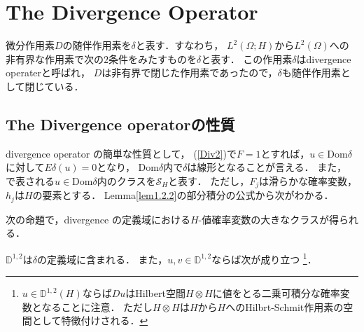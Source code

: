 \section{The Divergence Operator}
\begin{definition}%
微分作用素$D$の随伴作用素を$\delta$と表す．すなわち，
$L^2(\Omega;H)$から$L^2(\Omega)$への非有界な作用素で次の$2$条件をみたすものを$\delta$と表す．
この作用素$\delta$はdivergence operaterと呼ばれ，
$D$は非有界で閉じた作用素であったので，$\delta$も随伴作用素として閉じている．

\subsection{The Divergence operatorの性質}
divergence operator の簡単な性質として，
(\ref{Div2})で$F=1$とすれば，$u\in\text{Dom}\delta$に対して$E\delta(u)=0$となり，
$\text{Dom}\delta$内で$\delta$は線形となることが言える．
また，
で表される$u\in\text{Dom}\delta$内のクラスを$\mathcal{S}_H$と表す．
ただし，$F_j$は滑らかな確率変数，$h_j$は$H$の要素とする．
Lemma\ref{lem1.2.2}の部分積分の公式から次がわかる．

次の命題で，divergence の定義域における$H$-値確率変数の大きなクラスが得られる．
\begin{proposition}\label{prop1.3.1}
$\mathbb{D}^{1,2}$は$\delta$の定義域に含まれる．
また，$u,v\in\mathbb{D}^{1,2}$ならば次が成り立つ
\footnote{$u\in\mathbb{D}^{1,2}(H)$ならば$Du$はHilbert空間$H\otimes H$に値をとる二乗可積分な確率変数となることに注意．
	ただし$H\otimes H$は$H$から$H$へのHilbrt-Schmit作用素の空間として特徴付けされる．}．
\end{proposition}


\end{definition}

